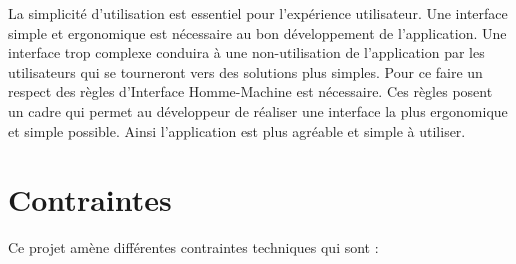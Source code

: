 \documentclass[a4paper, 12pt]{article}
\begin{document}
            La simplicité d'utilisation est essentiel pour l'expérience utilisateur. Une interface simple et ergonomique est nécessaire au bon développement de l'application. Une interface trop complexe conduira à une non-utilisation de l'application par les utilisateurs qui se tourneront vers des solutions plus simples.
            Pour ce faire un respect des règles d'Interface Homme-Machine est nécessaire. Ces règles posent un cadre qui permet au développeur de réaliser une interface la plus ergonomique et simple possible. Ainsi l'application est plus agréable et simple à utiliser.

\section{Contraintes}
Ce projet amène différentes contraintes techniques qui sont :
\\
\end{document}
